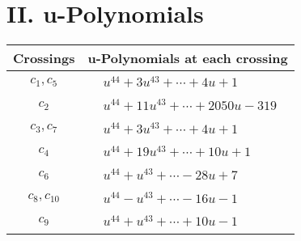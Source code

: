 \documentclass[1p]{elsarticle_modified}
\theoremstyle{definition}
\begin{document}
\newpage\renewcommand{\arraystretch}{1}
\centering \section*{ II. u-Polynomials}
\begin{tabular}{m{50pt}|m{274pt}}
Crossings & \hspace{64pt}u-Polynomials at each crossing \\
\hline $$\begin{aligned}c_{1},c_{5}\end{aligned}$$&$\begin{aligned}
&u^{44}+3 u^{43}+\cdots+4 u+1
\end{aligned}$\\
\hline $$\begin{aligned}c_{2}\end{aligned}$$&$\begin{aligned}
&u^{44}+11 u^{43}+\cdots+2050 u-319
\end{aligned}$\\
\hline $$\begin{aligned}c_{3},c_{7}\end{aligned}$$&$\begin{aligned}
&u^{44}+3 u^{43}+\cdots+4 u+1
\end{aligned}$\\
\hline $$\begin{aligned}c_{4}\end{aligned}$$&$\begin{aligned}
&u^{44}+19 u^{43}+\cdots+10 u+1
\end{aligned}$\\
\hline $$\begin{aligned}c_{6}\end{aligned}$$&$\begin{aligned}
&u^{44}+u^{43}+\cdots-28 u+7
\end{aligned}$\\
\hline $$\begin{aligned}c_{8},c_{10}\end{aligned}$$&$\begin{aligned}
&u^{44}- u^{43}+\cdots-16 u-1
\end{aligned}$\\
\hline $$\begin{aligned}c_{9}\end{aligned}$$&$\begin{aligned}
&u^{44}+u^{43}+\cdots+10 u-1
\end{aligned}$\\
\hline
\end{tabular}\newpage\renewcommand{\arraystretch}{1}
\end{document}
